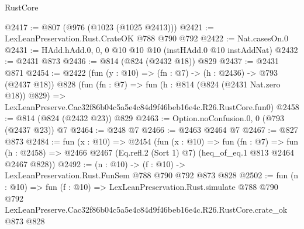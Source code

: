 \begin{lexlean}{RustCore}
\begin{coremodule}
@2417 := @807 (@976 (@1023 (@1025 @2413)))
@2421 := LexLeanPreservation.Rust.CrateOK @788 @790 @792
@2422 := Nat.casesOn.{0}
@2431 := HAdd.hAdd.{0, 0, 0} @10 @10 @10 (instHAdd.{0} @10 instAddNat)
@2432 := @2431 @873
@2436 := @814 (@824 (@2432 @18)) @829
@2437 := @2431 @871
@2454 := @2422
    (fun (y : @10) => (fn : @7) -> (h : @2436) -> @793 (@2437 @18))
    @828
    (fun (fn : @7) =>
    fun (h : @814 (@824 (@2431 Nat.zero @18)) @829) =>
    LexLeanPreserve.Cac32f86b04c5a5e4c84d9f46beb16e4c.R26.RustCore.fun0)
@2458 := @814 (@824 (@2432 @23)) @829
@2463 := Option.noConfusion.{0, 0} (@793 (@2437 @23)) @7
@2464 := @248 @7
@2466 := @2463 @2464 @7
@2467 := @827 @873
@2484 := fun (x : @10) =>
  @2454
    (fun (x : @10) =>
    fun (fn : @7) =>
    fun (h : @2458) => @2466 @2467 (Eq.refl.{2} (Sort 1) @7) (heq_of_eq.{1} @813 @2464 @2467 @828))
@2492 := (n : @10) -> (f : @10) -> LexLeanPreservation.Rust.FunSem @788 @790 @792 @873 @828
@2502 := fun (n : @10) =>
  fun (f : @10) =>
  LexLeanPreservation.Rust.simulate
    @788
    @790
    @792
    LexLeanPreserve.Cac32f86b04c5a5e4c84d9f46beb16e4c.R26.RustCore.crate_ok
    @873
    @828
\end{coremodule}
\end{lexlean}
